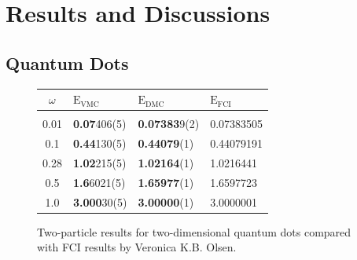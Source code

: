 \section{Results and Discussions}

\subsection{Quantum Dots}

\begin{frame}


\begin{figure}
 \begin{center}
 \begin{tabular}{c|lll}
  $\omega$ & $\mathrm{E_{VMC}}$ & $\mathrm{E_{DMC}}$ & $\mathrm{E_{FCI}}$\\
\hline\hline
\multicolumn{4}{c}{} \\
 0.01   & \textbf{0.07}406(5)  & \textbf{0.07383}9(2)  & 0.07383505 \\
 0.1    & \textbf{0.44}130(5)  & \textbf{0.44079}(1)   & 0.44079191 \\
 0.28   & \textbf{1.02}215(5)  & \textbf{1.02164}(1)   & 1.0216441  \\
 0.5    & \textbf{1.6}6021(5)  & \textbf{1.65977}(1)   & 1.6597723  \\
 1.0    & \textbf{3.000}30(5)  & \textbf{3.00000}(1)   & 3.0000001  \\
\cline{1-4}
 \end{tabular}  
 \end{center}
  \caption{Two-particle results for two-dimensional quantum dots compared with FCI results by Veronica K.B. Olsen.}
\end{figure}
\end{frame}


